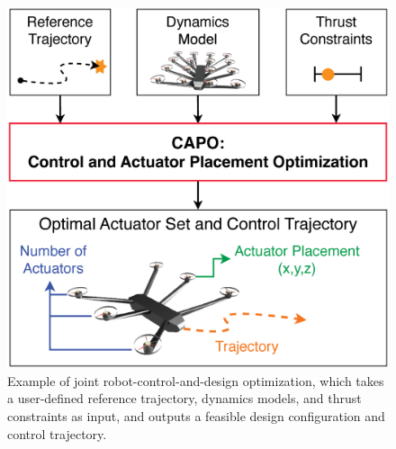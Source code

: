 \begin{figure}

    \centering
    \includegraphics[width=0.6\linewidth]{figures/Figure_1_CAPO_motivation.eps}
    \caption{Example of joint robot-control-and-design optimization, which takes a user-defined reference trajectory, dynamics models, and thrust constraints as input, and outputs a feasible design configuration and control trajectory. %
    }
    \label{fig:simple_example}

\end{figure}

